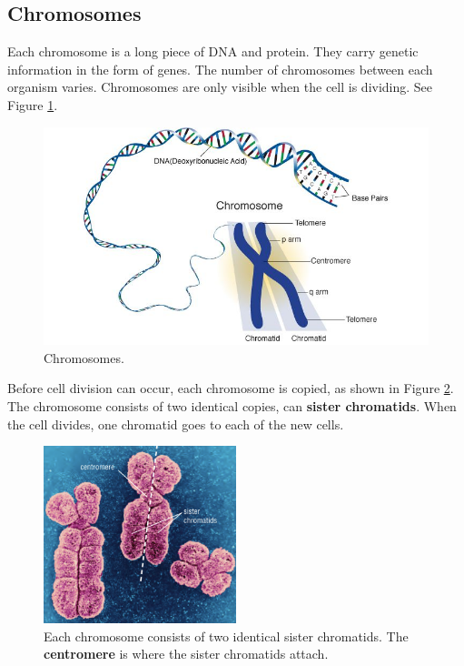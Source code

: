 \documentclass[12pt]{report}
\begin{document}
\subsection{Chromosomes}
\begin{definition}[Chromosomes]
    Each chromosome is a long piece of DNA and protein. They carry genetic information in the form of genes. The number of chromosomes between each organism varies. Chromosomes are only visible when the cell is dividing. See Figure \ref{fig:chromosomes}.
\end{definition}
\begin{figure}[H]
\centering
    \includegraphics[width=\textwidth]{../figures/chromosomes.jpg}
    \caption{Chromosomes.}
    \label{fig:chromosomes}
\end{figure}

Before cell division can occur, each chromosome is copied, as shown in Figure \ref{fig:textbook-chromosomes}. The chromosome consists of two identical copies, can \textbf{sister chromatids}. When the cell divides, one chromatid goes to each of the new cells. 

\begin{figure}[H]
\centering
    \includegraphics[width=0.5\textwidth]{../figures/textbook-chromosomes}
    \caption{Each chromosome consists of two identical sister chromatids. The \textbf{centromere} is where the sister chromatids attach.}
    \label{fig:textbook-chromosomes}
\end{figure}
\end{document}
